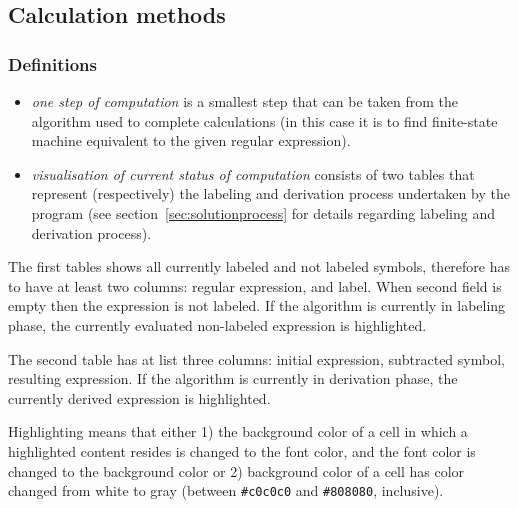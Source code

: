 \documentclass{article}
\begin{document}
\subsection{Calculation methods}
\label{sec:calcmethods}

\subsubsection*{Definitions}
\begin{itemize}%

  \item \textit{one step of computation} is a smallest step that can be taken from the algorithm
  used to complete calculations (in this case it is to find finite-state machine equivalent to the
  given regular expression).

  \item \textit{visualisation of current status of computation} consists of two tables that
  represent (respectively) the labeling and derivation process undertaken by the program (see
  section~\ref{sec:solutionprocess} for details regarding labeling and derivation process).

\end{itemize}

The first tables shows all currently labeled and not labeled symbols, therefore has to have at least
two columns: regular expression, and label. When second field is empty then the expression is not
labeled. If the algorithm is currently in labeling phase, the currently evaluated non-labeled
expression is highlighted.

The second table has at list three columns: initial expression, subtracted symbol, resulting
expression. If the algorithm is currently in derivation phase, the currently derived expression is
highlighted.

Highlighting means that either 1) the background color of a cell in which a highlighted content
resides is changed to the font color, and the font color is changed to the background color or 2)
background color of a cell has color changed from white to gray (between \verb|#c0c0c0| and
\verb|#808080|, inclusive).
\end{document}
